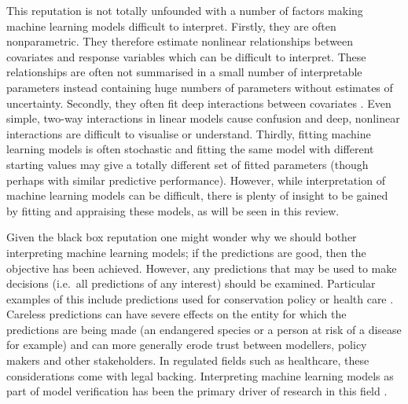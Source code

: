 \documentclass[10pt,]{article}
\begin{document}
This reputation is not totally unfounded with a number of factors making machine learning models difficult to interpret.
Firstly, they are often nonparametric.
They therefore estimate nonlinear relationships between covariates and response variables which can be difficult to interpret.
These relationships are often not summarised in a small number of interpretable parameters instead containing huge numbers of parameters without estimates of uncertainty.
Secondly, they often fit deep interactions between covariates \citep{lunetta2004screening}.
Even simple, two-way interactions in linear models cause confusion \citep{engqvist2005mistreatment, lamina2012visualizing} and deep, nonlinear interactions are difficult to visualise or understand.
Thirdly, fitting machine learning models is often stochastic \citep{breiman2001random, glorot2002understanding} and fitting the same model with different starting values may give a totally different set of fitted parameters (though perhaps with similar predictive performance).
However, while interpretation of machine learning models can be difficult, there is plenty of insight to be gained by fitting and appraising these models, as will be seen in this review.

Given the black box reputation one might wonder why we should bother interpreting machine learning models; if the predictions are good, then the objective has been achieved.
However, any predictions that may be used to make decisions (i.e.~all predictions of any interest) should be examined.
Particular examples of this include predictions used for conservation policy or health care \citep{vayena2018machine}.
Careless predictions can have severe effects on the entity for which the predictions are being made (an endangered species or a person at risk of a disease for example) and can more generally erode trust between modellers, policy makers and other stakeholders.
In regulated fields such as healthcare, these considerations come with legal backing.
Interpreting machine learning models as part of model verification has been the primary driver of research in this field \citep{molnar, ribeiro2016should}.
\end{document}
